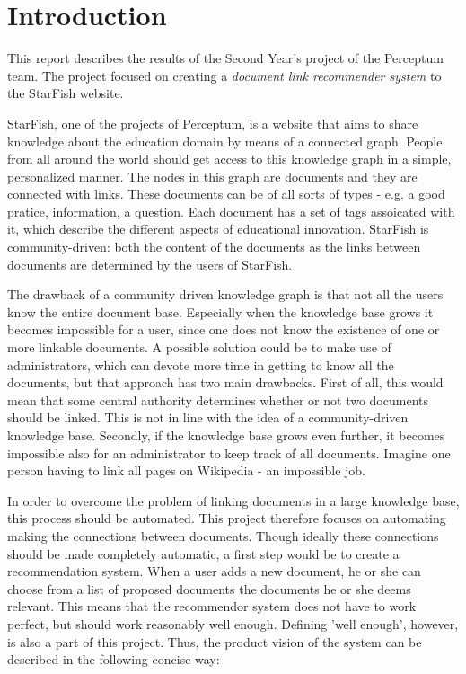 

\section{Introduction}

This report describes the results of the Second Year's project of the Perceptum team. The project focused on creating a \emph{document link recommender system} to the StarFish website. 

StarFish, one of the projects of Perceptum, is a website that aims to share knowledge about the education domain by means of a connected graph. People from all around the world should get access to this knowledge graph in a simple, personalized manner. The nodes in this graph are documents and they are connected with links. These documents can be of all sorts of types - e.g. a good pratice, information, a question. Each document has a set of tags assoicated with it, which describe the different aspects of educational innovation. StarFish is community-driven: both the content of the documents as the links between documents are determined by the users of StarFish. 

The drawback of a community driven knowledge graph is that not all the users know the entire document base. Especially when the knowledge base grows it becomes impossible for a user, since one does not know the existence of one or more linkable documents. A possible solution could be to make use of administrators, which can devote more time in getting to know all the documents, but that approach has two main drawbacks. First of all, this would mean that some central authority determines whether or not two documents should be linked. This is not in line with the idea of a community-driven knowledge base. Secondly, if the knowledge base grows even further, it becomes impossible also for an administrator to keep track of all documents. Imagine one person having to link all pages on Wikipedia - an impossible job. 

In order to overcome the problem of linking documents in a large knowledge base, this process should be automated. This project therefore focuses on automating making the connections between documents. Though ideally these connections should be made completely automatic, a first step would be to create a recommendation system. When a user adds a new document, he or she can choose from a list of proposed documents the documents he or she deems relevant. This means that the recommendor system does not have to work perfect, but should work reasonably well enough. Defining 'well enough', however, is also a part of this project. Thus, the product vision of the system can be described in the following concise way:

